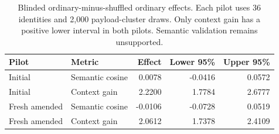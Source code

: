 \begin{table}[H]\centering\small
\begin{tabular}{llrrr}\toprule
Pilot & Metric & Effect & Lower 95\% & Upper 95\% \\ \midrule
Initial & Semantic cosine & 0.0078 & -0.0416 & 0.0572 \\
Initial & Context gain & 2.2200 & 1.7784 & 2.6777 \\
Fresh amended & Semantic cosine & -0.0106 & -0.0728 & 0.0519 \\
Fresh amended & Context gain & 2.0612 & 1.7378 & 2.4109 \\
\bottomrule\end{tabular}
\caption{Blinded ordinary-minus-shuffled ordinary effects. Each pilot uses 36 identities and 2,000 payload-cluster draws. Only context gain has a positive lower interval in both pilots. Semantic validation remains unsupported.}\label{tab:v4-pilot}
\end{table}
